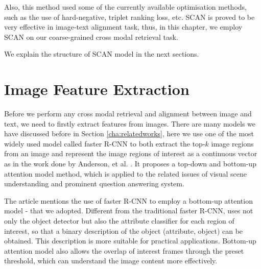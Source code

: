 Also, this method used some of the currently available optimisation methods, such as the use of hard-negative, triplet ranking loss, etc. SCAN is proved to be very effective in image-text alignment task, thus, in this chapter, we employ SCAN on our coarse-grained cross modal retrieval task.


We explain the structure of SCAN model in the next sections.

\section{Image Feature Extraction}
Before we perform any cross modal retrieval and alignment between image and text, we need to firstly extract features from images. There are many models we have discussed before in Section \ref{cha:relatedworks}, here we use one of the most widely used model called faster R-CNN to both extract the top-$k$ image regions from an image and represent the image regions of interest as a continuous vector as in the work done by Anderson, et al. \cite{bottomup}. It proposes a top-down and bottom-up attention model method, which is applied to the related issues of visual scene understanding and prominent question answering system.  

The article mentions the use of faster R-CNN to employ a bottom-up attention model - that we adopted. Different from the traditional faster R-CNN, \cite{bottomup} uses not only the object detector but also the attribute classifier for each region of interest, so that a binary description of the object (attribute, object) can be obtained. This description is more suitable for practical applications. Bottom-up attention model also allows the overlap of interest frames through the preset threshold, which can understand the image content more effectively.



